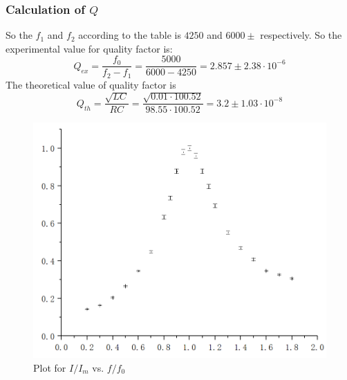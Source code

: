 \documentclass[12pt]{article}
\begin{document}
\subsubsection{Calculation of $Q$}
So the $f_1$ and $f_2$ according to the table is $4250$ and $6000\pm$ respectively. So the experimental value for quality factor is:
$$Q_{ex}=\frac{f_0}{f_2-f_1}=\frac{5000}{6000-4250}=2.857\pm2.38\cdot10^{-6}$$
The theoretical value of quality factor is 
$$Q_{th}=\frac{\sqrt{LC}}{RC}=\frac{\sqrt{0.01\cdot100.52}}{98.55\cdot100.52}=3.2\pm1.03\cdot10^{-8}$$
\begin{figure}[H]
\centering
\includegraphics[scale=0.5]{P10.jpg}
\caption{Plot for $I/I_m$ vs. $f/f_0$}
\end{figure}
\end{document}
